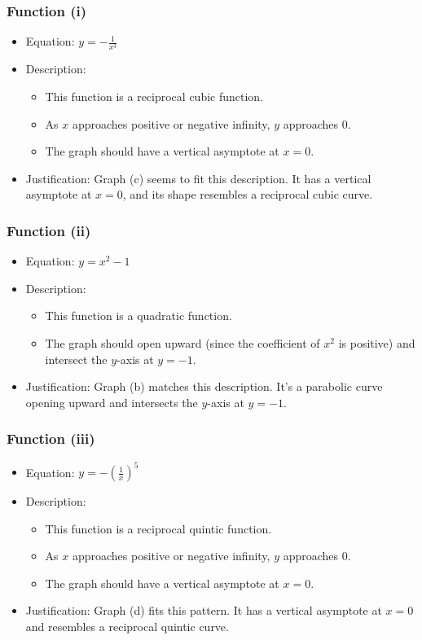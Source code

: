 \documentclass{article}
\begin{document}
\begin{itemize}
\subsubsection*{Function (i)}
\begin{itemize}
    \item Equation: \(y = -\frac{1}{x^3}\)
    \item Description:
    \begin{itemize}
        \item This function is a reciprocal cubic function.
        \item As \(x\) approaches positive or negative infinity, \(y\) approaches 0.
        \item The graph should have a vertical asymptote at \(x = 0\).
    \end{itemize}
    \item Justification: Graph (c) seems to fit this description. It has a vertical asymptote at \(x = 0\), and its shape resembles a reciprocal cubic curve.
\end{itemize}

\subsubsection*{Function (ii)}
\begin{itemize}
    \item Equation: \(y = x^2 - 1\)
    \item Description:
    \begin{itemize}
        \item This function is a quadratic function.
        \item The graph should open upward (since the coefficient of \(x^2\) is positive) and intersect the \(y\)-axis at \(y = -1\).
    \end{itemize}
    \item Justification: Graph (b) matches this description. It's a parabolic curve opening upward and intersects the \(y\)-axis at \(y = -1\).
\end{itemize}

\subsubsection*{Function (iii)}
\begin{itemize}
    \item Equation: \(y = -\left(\frac{1}{x}\right)^5\)
    \item Description:
    \begin{itemize}
        \item This function is a reciprocal quintic function.
        \item As \(x\) approaches positive or negative infinity, \(y\) approaches 0.
        \item The graph should have a vertical asymptote at \(x = 0\).
    \end{itemize}
    \item Justification: Graph (d) fits this pattern. It has a vertical asymptote at \(x = 0\) and resembles a reciprocal quintic curve.
\end{itemize}


\end{itemize}
\end{document}
